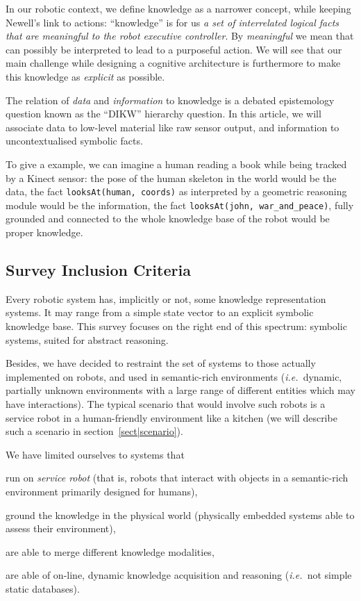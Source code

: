 \documentclass[a4paper, twocolumn]{article}
\newcommand{\ie}{{\textit{i.e.\ }}}
\newcommand{\concept}[1]{{\footnotesize \texttt{#1}}}
\begin{document}
In our robotic context, we define knowledge as a narrower concept, while
keeping Newell's link to actions: ``knowledge'' is for us  \emph{a set of
interrelated logical facts that are meaningful to the robot executive
controller}. By \emph{meaningful} we mean that can possibly be interpreted to
lead to a purposeful action. We will see that our main challenge while
designing a cognitive architecture is furthermore to make this knowledge as
\emph{explicit} as possible.

The relation of \emph{data} and \emph{information} to knowledge is a debated
epistemology question known as the ``DIKW'' hierarchy question. In this article,
we will associate data to low-level material like raw sensor output, and
information to uncontextualised symbolic facts.

To give a example, we can imagine a human reading a book while being tracked by
a Kinect sensor: the pose of the human skeleton in the world would be the data,
the fact \concept{looksAt(human, coords)} as interpreted by a geometric reasoning
module would be the information, the fact \concept{looksAt(john,
war\_and\_peace)}, fully grounded and connected to the whole knowledge base of
the robot would be proper knowledge.

\subsection*{Survey Inclusion Criteria}
\label{sect|inclusion-criteria}

Every robotic system has, implicitly or not, some knowledge representation
systems. It may range from a simple state vector to an explicit symbolic
knowledge base.  This survey focuses on the right end of this spectrum:
symbolic systems, suited for abstract reasoning.

Besides, we have decided to restraint the set of systems to those actually
implemented on robots, and used in semantic-rich environments (\ie dynamic,
partially unknown environments with a large range of different entities which
may have interactions). The typical scenario that would involve such robots is
a service robot in a human-friendly environment like a kitchen (we will
describe such a scenario in section~\ref{sect|scenario}).

We have limited ourselves to systems that
\begin{inparaenum} 
    \item  run on \emph{service robot} (that is, robots that interact with 
    objects in a semantic-rich environment primarily designed for humans),
    \item  ground the knowledge in the physical world (physically embedded
    systems able to assess their environment),
    \item  are able to merge different knowledge modalities,
    \item  are able of on-line, dynamic knowledge acquisition and reasoning 
    (\ie not simple static databases).
\end{inparaenum}
\end{document}
